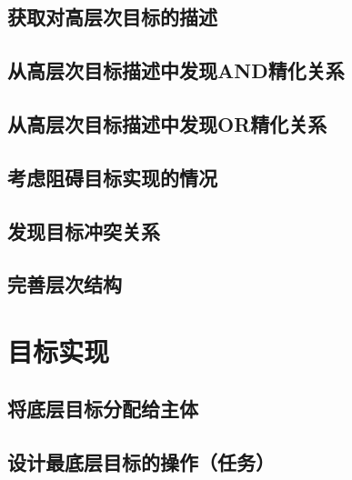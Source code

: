 \documentclass[UTF8]{ctexart}
\begin{document}
\subsection{获取对高层次目标的描述}
\subsection{从高层次目标描述中发现AND精化关系}
\subsection{从高层次目标描述中发现OR精化关系}
\subsection{考虑阻碍目标实现的情况}
\subsection{发现目标冲突关系}
\subsection{完善层次结构}

\section{目标实现}
\subsection{将底层目标分配给主体}
\subsection{设计最底层目标的操作（任务）}
\end{document}
